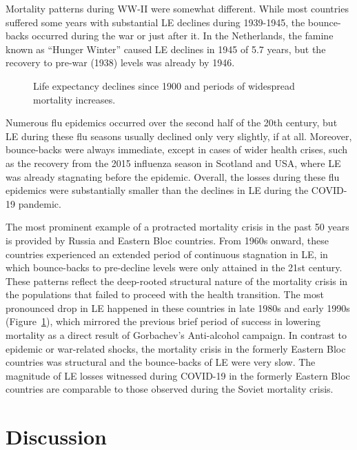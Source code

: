 \documentclass[12pt]{article}
\begin{document}
Mortality patterns during WW-II were somewhat different. While most countries suffered some years with substantial LE declines during 1939-1945, the bounce-backs occurred during the war or just after it. In the Netherlands, the famine known as ``Hunger Winter'' caused LE declines in 1945 of 5.7 years, but the recovery to pre-war (1938) levels was already  by 1946.\citealp{Lumey1994}

\begin{figure}[ht!]
    \centering
    \caption{Life expectancy declines since 1900 and periods of widespread mortality increases.}
    \label{fig:e0diffhistoric}
\end{figure}

Numerous flu epidemics occurred over the second half of the 20th century, but  LE during these flu seasons usually declined only very slightly, if at all. Moreover, bounce-backs were always immediate, except in cases of wider health crises, such as the recovery from the 2015 influenza season in Scotland and USA, where LE was already stagnating before the epidemic\citealp{Fenton2019}. Overall, the losses during these flu epidemics were substantially smaller than the declines in LE during the COVID-19 pandemic.

The most prominent example of a protracted mortality crisis in the past 50 years is provided by Russia and Eastern Bloc countries. From 1960s onward, these countries experienced an extended period of continuous stagnation in LE, in which bounce-backs to pre-decline levels were only attained in the 21st century.\citealp{Shkolnikov2013} These patterns reflect the deep-rooted structural nature of the mortality crisis in the populations that failed to proceed with the health transition.\citealp{Timonin2016} The most pronounced drop in LE happened in these countries in late 1980s and early 1990s (Figure~\ref{fig:e0diffhistoric}), which mirrored the previous brief period of success in lowering mortality\citealp{Zakharov1999} as a direct result of Gorbachev's Anti-alcohol campaign.\citealp{Leon2009} In contrast to epidemic or war-related shocks, the mortality crisis in the formerly Eastern Bloc countries was structural and the bounce-backs of LE were very slow. The magnitude of LE losses witnessed during COVID-19 in the formerly Eastern Bloc countries are comparable to those observed during the Soviet mortality crisis.

\section*{Discussion}
\end{document}
